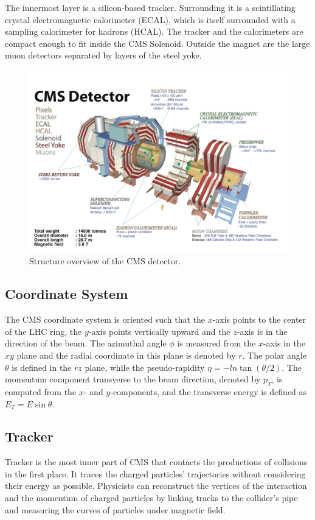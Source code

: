 The innermost layer is a silicon-based tracker. Surrounding it is a scintillating crystal electromagnetic calorimeter (ECAL), which is itself surrounded with a sampling calorimeter for hadrons (HCAL). The tracker and the calorimeters are compact enough to fit inside the CMS Solenoid. Outside the magnet are the large muon detectors separated by layers of the steel yoke.

\begin{figure}[hbtp]
  \begin{center}
    \includegraphics[width=\textwidth]{figure/CH2/CMS.png}
  \end{center}
  \caption{\label{fig:CMS}Structure overview of the CMS detector.}
\end{figure}
\subsection*{Coordinate System}

The CMS coordinate system is oriented such that the $x$-axis points to the center of the LHC ring, the $y$-axis points vertically upward and the $z$-axis is in the direction of the beam. The azimuthal angle $\phi$ is measured from the $x$-axis in the $xy$ plane and the radial coordinate in this plane is denoted by $r$. The polar angle $\theta$ is defined in the $rz$ plane, while the pseudo-rapidity $\eta = -ln\tan{(\theta/2)}$. The momentum component transverse to the beam direction, denoted by $p_{T}$, is computed from the $x$- and $y$-components, and the transverse energy is defined as $E_{T} = E\sin\theta$.

\subsection{Tracker}
Tracker is the most inner part of CMS that contacts the productions of collisions in the first place. It traces the charged particles' trajectories without considering their energy as possible. Physicists can reconstruct the vertices of the interaction and the momentum of charged particles by linking tracks to the collider's pipe and measuring the curves of particles under magnetic field.

